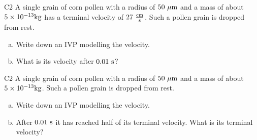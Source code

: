 \begin{problem}{C2}
A single grain of corn pollen with a radius of \(50\ {\rm \mu m}\) and a mass of about \(5 \times 10^{-13} {\rm kg}\) has a terminal velocity of \(27\ {\rm \frac{cm}{s}}\).  Such a pollen grain is dropped from rest.  
\begin{enumerate}[(a)]
\item Write down an IVP modelling the velocity.
\item What is its velocity after \(0.01\ {\rm s}\)?
\end{enumerate}
\end{problem}

\begin{problem}{C2}
A single grain of corn pollen with a radius of \(50\ {\rm \mu m}\) and a mass of about \(5 \times 10^{-13} {\rm kg}\).  Such a pollen grain is dropped from rest.  
\begin{enumerate}[(a)]
\item Write down an IVP modelling the velocity.
\item After  \(0.01\ {\rm s}\) it has reached half of its terminal velocity.  What is its terminal velocity?
\end{enumerate}
\end{problem}
